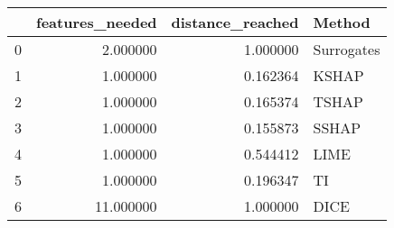 \begin{tabular}{lrrl}
\toprule
 & features_needed & distance_reached & Method \\
\midrule
0 & 2.000000 & 1.000000 & Surrogates \\
1 & 1.000000 & 0.162364 & KSHAP \\
2 & 1.000000 & 0.165374 & TSHAP \\
3 & 1.000000 & 0.155873 & SSHAP \\
4 & 1.000000 & 0.544412 & LIME \\
5 & 1.000000 & 0.196347 & TI \\
6 & 11.000000 & 1.000000 & DICE \\
\bottomrule
\end{tabular}
